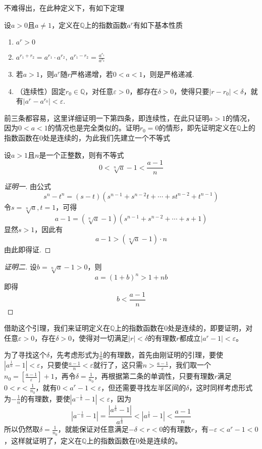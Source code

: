 不难得出，在此种定义下，有如下定理
\begin{theorem}
  设$a>0$且$a \neq 1$，定义在$\mathbb{Q}$上的指数函数$a^r$有如下基本性质
\begin{enumerate}
\item $a^r>0$
\item $a^{r_1+r_2}=a^{r_1}\cdot a^{r_2}, \ a^{r_1-r_2} = \frac{a^{r_1}}{a^{r_2}} $
\item 若$a>1$，则$a^r$随$r$严格递增，若$0<a<1$，则是严格递减.
\item （连续性）固定$r_0\in \mathbb{Q}$，对任意$\varepsilon>0$，都存在$\delta>0$，使得只要$|r-r_0|<\delta$，就有$|a^r-a^{r_0}|<\varepsilon$.
\end{enumerate}
\end{theorem}

前三条都容易，这里详细证明一下第四条，即连续性，在此只证明$a>1$的情况，因为$0<a<1$的情况也是完全类似的。证明$r_0=0$的情形，即先证明定义在$\mathbb{Q}$上的指数函数在$0$处是连续的，为此我们先建立一个不等式
\begin{lemma}
  设$a>1$且$n$是一个正整数，则有不等式
  \[ 0< \sqrt[n]{a}-1 < \frac{a-1}{n} \]
\end{lemma}

\begin{proof}[证明一]
  由公式
  \[ s^n-t^n=(s-t)(s^{n-1}+s^{n-2}t+\cdots+st^{n-2}+t^{n-1}) \]
  令$s=\sqrt[n]{a},t=1$，可得
  \[ a-1=(\sqrt[n]{a}-1)(s^{n-1}+s^{n-2}+\cdots+s+1) \]
  显然$s>1$，因此有
  \[ a-1> (\sqrt[n]{a}-1) \cdot n\]
  由此即得证.
\end{proof}

\begin{proof}[证明二]
  设$b=\sqrt[n]{a}-1>0$，则
  \[ a = (1+b)^n > 1 + nb \]
  即得
  \[ b < \frac{a-1}{n} \]
\end{proof}

借助这个引理，我们来证明定义在$\mathbb{Q}$上的指数函数在0处是连续的，即要证明，对任意$\varepsilon>0$，存在$\delta>0$，使得对一切满足$|r|<\delta$的有理数$r$都成立$|a^r-1|<\varepsilon$。

为了寻找这个$\delta$，先考虑形式为$\frac{1}{n}$的有理数，首先由刚证明的引理，要使$|a^{\frac{1}{n}}-1|<\varepsilon$，只要使$\frac{a-1}{n}<\varepsilon$就行了，这只需$n>\frac{a-1}{\varepsilon}$，我们取一个$n_0 = \left[ \frac{a-1}{\varepsilon} \right]+1$，再令$\delta=\frac{1}{n_0}$，再根据第二条的单调性，只要有理数$r$满足$0<r<\frac{1}{n_0}$，就有$0<a^r-1<\varepsilon$，但还需要寻找左半区间的$\delta$，这时同样考虑形式为$-\frac{1}{n}$的有理数，要使$|a^{-\frac{1}{n}}-1|<\varepsilon$，因为
\[ |a^{-\frac{1}{n}}-1|=\frac{|a^{\frac{1}{n}}-1|}{a^{\frac{1}{n}}} < |a^{\frac{1}{n}}-1| < \frac{a-1}{n} \]
所以仍然取$\delta=\frac{1}{n_0}$，就能保证对任意满足$-\delta<r<0$的有理数$r$，有$-\varepsilon<a^r-1<0$，这样就证明了，定义在$\mathbb{Q}$上的指数函数在$0$处是连续的。

